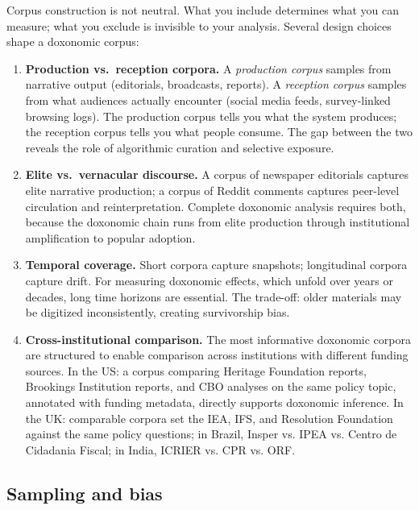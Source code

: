 Corpus construction is not neutral.
What you include determines what you can measure; what you exclude is invisible to your analysis.
Several design choices shape a doxonomic corpus:

\begin{enumerate}
  \item \textbf{Production vs.\ reception corpora.}
  A \emph{production corpus} samples from narrative output (editorials, broadcasts, reports).
  A \emph{reception corpus} samples from what audiences actually encounter (social media feeds, survey-linked browsing logs).
  The production corpus tells you what the system produces; the reception corpus tells you what people consume.
  The gap between the two reveals the role of algorithmic curation and selective exposure.

  \item \textbf{Elite vs.\ vernacular discourse.}
  A corpus of newspaper editorials captures elite narrative production; a corpus of Reddit comments captures peer-level circulation and reinterpretation.
  Complete doxonomic analysis requires both, because the doxonomic chain runs from elite production through institutional amplification to popular adoption.

  \item \textbf{Temporal coverage.}
  Short corpora capture snapshots; longitudinal corpora capture drift.
  For measuring doxonomic effects, which unfold over years or decades, long time horizons are essential.
  The trade-off: older materials may be digitized inconsistently, creating survivorship bias.

  \item \textbf{Cross-institutional comparison.}
  The most informative doxonomic corpora are structured to enable comparison across institutions with different funding sources.
  In the US: a corpus comparing Heritage Foundation reports, Brookings Institution reports, and CBO analyses on the same policy topic, annotated with funding metadata, directly supports doxonomic inference.
  In the UK: comparable corpora set the IEA, IFS, and Resolution Foundation against the same policy questions; in Brazil, Insper vs. IPEA vs. Centro de Cidadania Fiscal; in India, ICRIER vs. CPR vs. ORF.
\end{enumerate}

\subsection{Sampling and bias}

